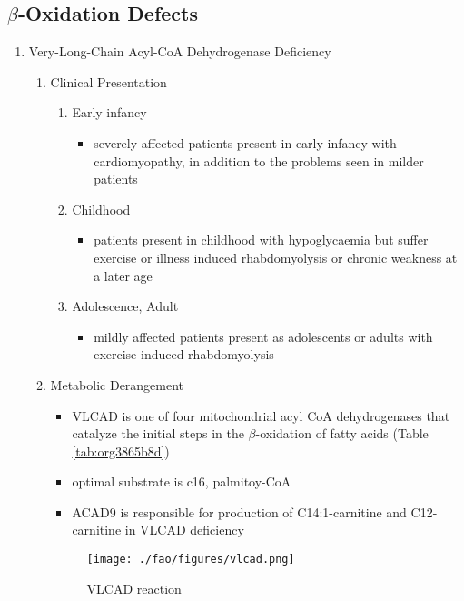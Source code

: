 \documentclass{scrartcl}
\begin{document}
\subsection{\(\beta\)-Oxidation Defects}
\label{sec:orgd74c6b9}
\begin{enumerate}
\item Very-Long-Chain Acyl-CoA Dehydrogenase Deficiency
\label{sec:org40491af}
\begin{enumerate}
\item Clinical Presentation
\label{sec:orgeb6ad16}
\begin{enumerate}
\item Early infancy
\label{sec:orgc3adbb1}
\begin{itemize}
\item severely affected patients present in early infancy with
cardiomyopathy, in addition to the problems seen in milder patients
\end{itemize}
\item Childhood
\label{sec:org24043ff}
\begin{itemize}
\item patients present in childhood with hypoglycaemia but suffer exercise
or illness induced rhabdomyolysis or chronic weakness at a later age
\end{itemize}
\item Adolescence, Adult
\label{sec:orgafc036f}
\begin{itemize}
\item mildly affected patients present as adolescents or adults with
exercise-induced rhabdomyolysis
\end{itemize}
\end{enumerate}
\item Metabolic Derangement
\label{sec:org9a98ca7}
\begin{itemize}
\item VLCAD is one of four mitochondrial acyl CoA dehydrogenases that
catalyze the initial steps in the \(\beta\)-oxidation of fatty acids
(Table \ref{tab:org3865b8d})
\item optimal substrate is c16, palmitoy-CoA
\item ACAD9 is responsible for production of C14:1-carnitine and
C12-carnitine in VLCAD deficiency
\end{itemize}
\begin{figure}[htbp]
\centering
\texttt{[image: ./fao/figures/vlcad.png]}
\caption{\label{fig:orgc3612b8}
VLCAD reaction}
\end{figure}


\end{enumerate}
\end{enumerate}
\end{document}
